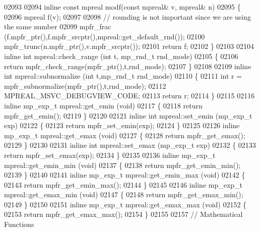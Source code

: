 \begin{DoxyCode}
{{02093 
02094 \textcolor{keyword}{inline} \textcolor{keyword}{const} mpreal modf(\textcolor{keyword}{const} mpreal& v, mpreal& n)
02095 \{
02096     mpreal f(v);
02097 
02098     \textcolor{comment}{// rounding is not important since we are using the same number}
02099     mpfr\_frac (f.mpfr\_ptr(),f.mpfr\_srcptr(),mpreal::get\_default\_rnd());
02100     mpfr\_trunc(n.mpfr\_ptr(),v.mpfr\_srcptr());
02101     \textcolor{keywordflow}{return} f;
02102 \}
02103 
02104 \textcolor{keyword}{inline} \textcolor{keywordtype}{int} mpreal::check\_range (\textcolor{keywordtype}{int} t, mp\_rnd\_t rnd\_mode)
02105 \{
02106     \textcolor{keywordflow}{return} mpfr\_check\_range(mpfr\_ptr(),t,rnd\_mode);
02107 \}
02108 
02109 \textcolor{keyword}{inline} \textcolor{keywordtype}{int} mpreal::subnormalize (\textcolor{keywordtype}{int} t,mp\_rnd\_t rnd\_mode)
02110 \{
02111     \textcolor{keywordtype}{int} r = mpfr\_subnormalize(mpfr\_ptr(),t,rnd\_mode);
02112     MPREAL\_MSVC\_DEBUGVIEW\_CODE;
02113     \textcolor{keywordflow}{return} r;
02114 \}
02115 
02116 \textcolor{keyword}{inline} mp\_exp\_t mpreal::get\_emin (\textcolor{keywordtype}{void})
02117 \{
02118     \textcolor{keywordflow}{return} mpfr\_get\_emin();
02119 \}
02120 
02121 \textcolor{keyword}{inline} \textcolor{keywordtype}{int} mpreal::set\_emin (mp\_exp\_t exp)
02122 \{
02123     \textcolor{keywordflow}{return} mpfr\_set\_emin(exp);
02124 \}
02125 
02126 \textcolor{keyword}{inline} mp\_exp\_t mpreal::get\_emax (\textcolor{keywordtype}{void})
02127 \{
02128     \textcolor{keywordflow}{return} mpfr\_get\_emax();
02129 \}
02130 
02131 \textcolor{keyword}{inline} \textcolor{keywordtype}{int} mpreal::set\_emax (mp\_exp\_t exp)
02132 \{
02133     \textcolor{keywordflow}{return} mpfr\_set\_emax(exp);
02134 \}
02135 
02136 \textcolor{keyword}{inline} mp\_exp\_t mpreal::get\_emin\_min (\textcolor{keywordtype}{void})
02137 \{
02138     \textcolor{keywordflow}{return} mpfr\_get\_emin\_min();
02139 \}
02140 
02141 \textcolor{keyword}{inline} mp\_exp\_t mpreal::get\_emin\_max (\textcolor{keywordtype}{void})
02142 \{
02143     \textcolor{keywordflow}{return} mpfr\_get\_emin\_max();
02144 \}
02145 
02146 \textcolor{keyword}{inline} mp\_exp\_t mpreal::get\_emax\_min (\textcolor{keywordtype}{void})
02147 \{
02148     \textcolor{keywordflow}{return} mpfr\_get\_emax\_min();
02149 \}
02150 
02151 \textcolor{keyword}{inline} mp\_exp\_t mpreal::get\_emax\_max (\textcolor{keywordtype}{void})
02152 \{
02153     \textcolor{keywordflow}{return} mpfr\_get\_emax\_max();
02154 \}
02155 
02157 \textcolor{comment}{// Mathematical Functions}
}}
\end{DoxyCode}
